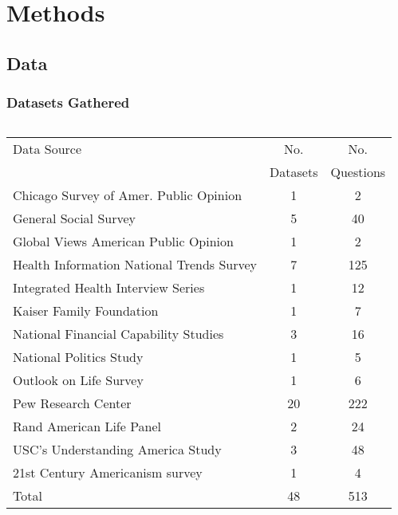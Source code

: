 \documentclass[pdf]{beamer}
\begin{document}
\section{Methods}

\subsection{Data}

\begin{frame}
  \frametitle{Datasets Gathered}
    \begin{columns}
      \begin{tabular}{|l|c|c|}
        \hline   %
        Data Source & No.  & No. \\
        & Datasets & Questions \\
        \hline
        Chicago Survey of Amer. Public Opinion  & 1 & 2 \\
        General Social Survey  & 5 & 40        \\
        Global Views American Public Opinion  & 1  & 2 \\
        Health Information National Trends Survey  & 7 & 125 \\
        Integrated Health Interview Series  & 1 & 12 \\
        Kaiser Family Foundation  & 1   & 7     \\
        National Financial Capability Studies & 3  & 16 \\
        National Politics Study  &  1 & 5 \\
        Outlook on Life Survey & 1  &  6 \\
        Pew Research Center  &  20 & 222          \\
        Rand American Life Panel & 2 & 24  \\
        USC's Understanding America Study  & 3 & 48 \\
        21st Century Americanism survey & 1 & 4 \\
        \hline  %
        Total & 48  & 513 \\
        \hline
      \end{tabular}
   \end{columns}

\end{frame}
\end{document}

